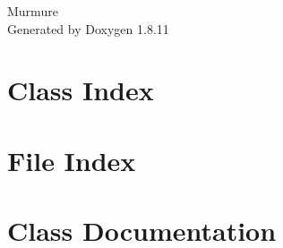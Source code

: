 \documentclass[twoside]{book}
\newcommand{\+}{\discretionary{\mbox{\scriptsize$\hookleftarrow$}}{}{}}
\newcommand{\clearemptydoublepage}{%
  \newpage{\pagestyle{empty}\cleardoublepage}%
}
\begin{document}
\hypersetup{pageanchor=false,
             bookmarksnumbered=true,
             pdfencoding=unicode
            }
\begin{titlepage}
\vspace*{7cm}
\begin{center}%
{\Large Murmure }\\
\vspace*{1cm}
{\large Generated by Doxygen 1.8.11}\\
\end{center}
\end{titlepage}
\clearemptydoublepage
\tableofcontents
\clearemptydoublepage
{}
\hypersetup{pageanchor=true}

\chapter{Class Index}

\chapter{File Index}

\chapter{Class Documentation}





























\end{document}
